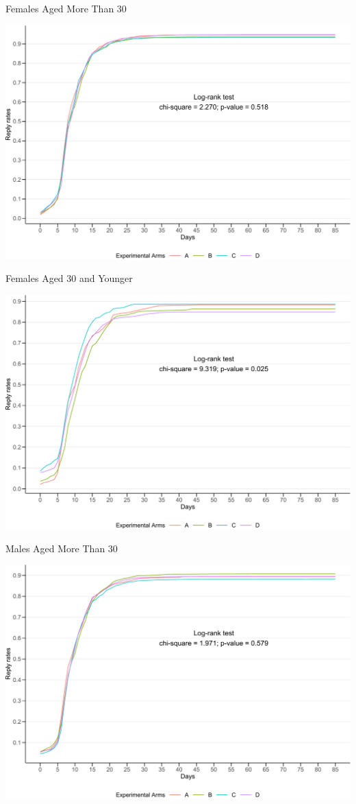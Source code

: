 \documentclass[
      aspectratio=169,
        12pt,
    ]{beamer}
\begin{document}
\begin{frame}{Females Aged More Than 30}
\protect\hypertarget{females-aged-more-than-30}{}
\begin{center}\includegraphics[width=0.75\linewidth]{report_files/figure-beamer/plot-surv-female-over30-1} \end{center}
\end{frame}

\begin{frame}{Females Aged 30 and Younger}
\protect\hypertarget{females-aged-30-and-younger}{}
\begin{center}\includegraphics[width=0.75\linewidth]{report_files/figure-beamer/plot-surv-female-less30-1} \end{center}
\end{frame}

\begin{frame}{Males Aged More Than 30}
\protect\hypertarget{males-aged-more-than-30}{}
\begin{center}\includegraphics[width=0.75\linewidth]{report_files/figure-beamer/plot-surv-male-over30-1} \end{center}
\end{frame}
\end{document}
